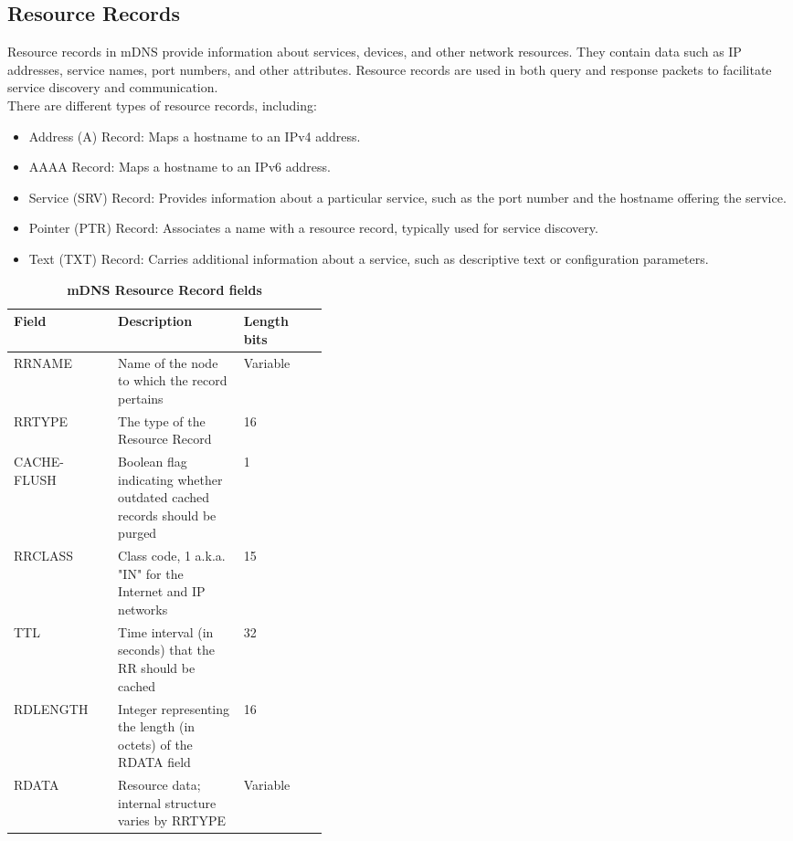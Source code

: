 \subsection{Resource Records}
Resource records in mDNS provide information about services, devices, and other network resources. They contain data such as IP addresses, service names, port numbers, and other attributes. Resource records are used in both query and response packets to facilitate service discovery and communication. \\
There are different types of resource records, including:
\begin{itemize}
    \item Address (A) Record: Maps a hostname to an IPv4 address.
    \item AAAA Record: Maps a hostname to an IPv6 address.
    \item Service (SRV) Record: Provides information about a particular service, such as the port number and the hostname offering the service.
    \item Pointer (PTR) Record: Associates a name with a resource record, typically used for service discovery.
    \item Text (TXT) Record: Carries additional information about a service, such as descriptive text or configuration parameters.
\end{itemize}

\begin{table}[H]
    \centering
    \caption{\textbf{mDNS Resource Record fields}}
    \begin{tabularx}{\linewidth}{|X|p{0.4\linewidth}|X|}
    \hline
    \textbf{Field} & \textbf{Description} & \textbf{Length bits}\\ \hline
    RRNAME & Name of the node to which the record pertains & Variable   \\ \hline
    RRTYPE & The type of the Resource Record & 16\\ \hline
    CACHE-FLUSH & Boolean flag indicating whether outdated cached records should be purged & 1\\ \hline
    RRCLASS & Class code, 1 a.k.a. "IN" for the Internet and IP networks & 15\\ \hline
    TTL & Time interval (in seconds) that the RR should be cached & 32\\ \hline
    RDLENGTH & Integer representing the length (in octets) of the RDATA field & 16\\ \hline
    RDATA & Resource data; internal structure varies by RRTYPE & Variable\\ \hline
    \end{tabularx}
    \label{tab:resource}
\end{table}


